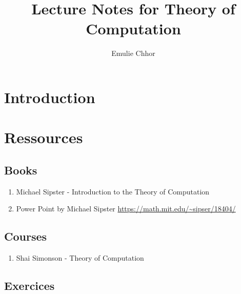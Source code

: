 \documentclass{article}
\begin{document}
\title{Lecture Notes for Theory of Computation}
\author{Emulie Chhor}
\maketitle

\section*{Introduction}

\newtheorem{definition}{Definition}[subsection]
\newtheorem{theorem}{Theorem}[subsection]
\newtheorem{corollary}{Corollary}[subsection]
\newtheorem{lemma}[theorem]{Lemma}
\newtheorem{proposition}{Proposition}[section]
\newtheorem{axiom}{Axiome}
\newtheorem{property}{Propriété}[subsection]
\newtheorem*{remark}{Remarque}
\newtheorem*{problem}{Problème}
\newtheorem*{intuition}{Intuition}

\section{Ressources}%
\label{sec:Ressources}

\subsection{Books}%
\label{sub:Books}

\begin{enumerate}
    \item Michael Sipster - Introduction to the Theory of Computation
    \item Power Point by Michael Sipster \url{https://math.mit.edu/~sipser/18404/}
\end{enumerate}

\subsection{Courses}%
\label{sub:Courses}

\begin{enumerate}
    \item Shai Simonson - Theory of Computation
\end{enumerate}

\subsection{Exercices}%
\label{sub:Exercices}
\end{document}
